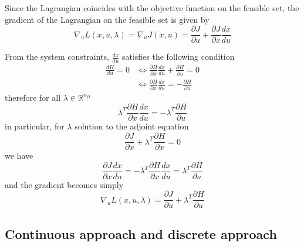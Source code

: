 Since the Lagrangian coincides with the objective function on the feasible set, the gradient of the Lagrangian on the feasible set is given by
\[
\nabla_u L (x, u, \lambda) = \nabla_u J (x, u) = \frac{\partial J}{\partial u} + \frac{\partial J}{\partial x}\frac{d x}{d u} 
\]

From the system constraints, $\frac{dx}{du}$ satisfies the following condition
\begin{align*}
\frac{dH}{du} = 0 
&\Leftrightarrow \frac{\partial H}{\partial x}\frac{dx}{du} + \frac{\partial H}{\partial u} = 0 \\
&\Leftrightarrow  \frac{\partial H}{\partial x}\frac{dx}{du} = - \frac{\partial H}{\partial u}
\end{align*}
%
therefore for all $\lambda \in \mathbb{R}^{n_H}$
%
\[
\lambda^T  \frac{\partial H}{\partial x}\frac{dx}{du} = - \lambda^T\frac{\partial H}{\partial u}
\]
in particular, for $\lambda$ solution to the adjoint equation
\[
\frac{\partial J}{\partial x} + \lambda^T\frac{\partial H}{\partial x} = 0
\]
we have
\[
\frac{\partial J}{\partial x}\frac{d x}{d u} = - \lambda^T\frac{\partial H}{\partial x}\frac{d x}{d u} = \lambda^T\frac{\partial H}{\partial u}
\]
and the gradient becomes simply
\[
\nabla_u L (x, u, \lambda)
= \frac{\partial J}{\partial u} + \lambda^T \frac{\partial H}{\partial u}
\label{eq:adjointGradient}
\]

\subsection{Continuous approach and discrete approach}
